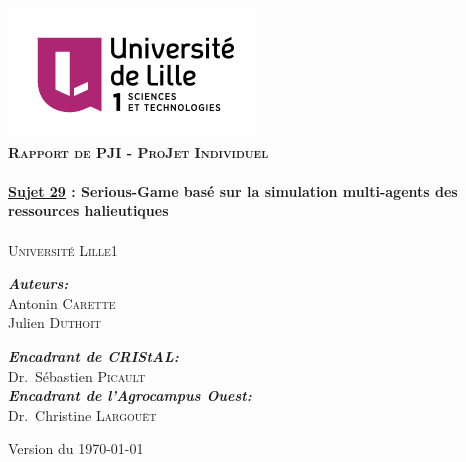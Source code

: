 \begin{titlepage}
\begin{center}

\includegraphics[scale=0.8]{img/logo-lille1.png}\\[2.5cm]

\textsc{\Large \bfseries Rapport de PJI - ProJet Individuel}\\[0.5cm]

\HRule \\[0.5cm]
{ \Large \bfseries \underline{Sujet 29} : Serious-Game basé sur la simulation multi-agents des
ressources halieutiques\\[0.5cm]}
\HRule \\[0.5cm]

\textsc{\large Université Lille1}\\[2cm]

\begin{minipage}{0.4\textwidth}
\begin{flushleft} \large
\emph{\bfseries Auteurs:}\\
Antonin \textsc{Carette} \\
Julien \textsc{Duthoit}
\end{flushleft}
\end{minipage}
\begin{minipage}{0.4\textwidth}
\begin{flushright} \large
\emph{\bfseries Encadrant de CRIStAL:} \\
Dr.~Sébastien \textsc{Picault}\\[0.2cm]
\emph{\bfseries Encadrant de l'Agrocampus Ouest:} \\
Dr.~Christine \textsc{Largouët}
\end{flushright}
\end{minipage}

\vfill

{\large Version du \today}

\end{center}
\end{titlepage}